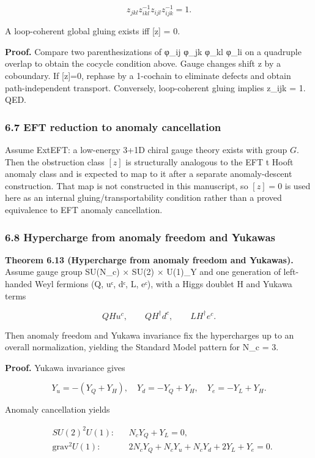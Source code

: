 \[
z_{jkl} z_{ikl}^{-1} z_{ijl} z_{ijk}^{-1} = 1.
\]

A loop-coherent global gluing exists iff {[}z{]} = 0.

\textbf{Proof.} Compare two parenthesizations of φ\_ij φ\_jk φ\_kl φ\_li on a quadruple overlap to obtain the cocycle condition above. Gauge changes shift z by a coboundary. If {[}z{]}=0, rephase by a 1-cochain to eliminate defects and obtain path-independent transport. Conversely, loop-coherent gluing implies z\_ijk = 1. QED.

\subsubsection{6.7 EFT reduction to anomaly cancellation}\label{67-eft-reduction-to-anomaly-cancellation}

Assume ExtEFT: a low-energy 3+1D chiral gauge theory exists with group \(G\). Then the obstruction class \([z]\) is structurally analogous to the EFT \textquotesingle t Hooft anomaly class and is expected to map to it after a separate anomaly-descent construction. That map is not constructed in this manuscript, so \([z]=0\) is used here as an internal gluing/transportability condition rather than a proved equivalence to EFT anomaly cancellation.

\subsubsection{6.8 Hypercharge from anomaly freedom and Yukawas}\label{68-hypercharge-from-anomaly-freedom-and-yukawas}

\textbf{Theorem 6.13 (Hypercharge from anomaly freedom and Yukawas).} Assume gauge group SU(N\_c) × SU(2) × U(1)\_Y and one generation of left-handed Weyl fermions (Q, uᶜ, dᶜ, L, eᶜ), with a Higgs doublet H and Yukawa terms

\[
Q H u^c,\qquad Q H^\dagger d^c,\qquad L H^\dagger e^c.
\]

Then anomaly freedom and Yukawa invariance fix the hypercharges up to an overall normalization, yielding the Standard Model pattern for N\_c = 3.

\textbf{Proof.} Yukawa invariance gives

\[
Y_u = -(Y_Q + Y_H),\quad
Y_d = -Y_Q + Y_H,\quad
Y_e = -Y_L + Y_H.
\]

Anomaly cancellation yields

\[
\begin{aligned}
&SU(2)^2 U(1): && N_c Y_Q + Y_L = 0,\\
&\mathrm{grav}^2 U(1): && 2 N_c Y_Q + N_c Y_u + N_c Y_d + 2 Y_L + Y_e = 0.
\end{aligned}
\]

